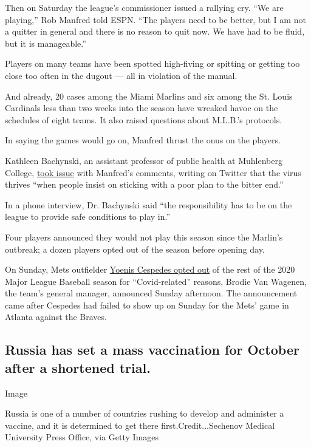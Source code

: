 Then on Saturday the league's commissioner issued a rallying cry. ``We
are playing,'' Rob Manfred told ESPN. ``The players need to be better,
but I am not a quitter in general and there is no reason to quit now. We
have had to be fluid, but it is manageable.''

Players on many teams have been spotted high-fiving or spitting or
getting too close too often in the dugout --- all in violation of the
manual.

And already, 20 cases among the Miami Marlins and six among the St.
Louis Cardinals less than two weeks into the season have wreaked havoc
on the schedules of eight teams. It also raised questions about M.L.B.'s
protocols.

In saying the games would go on, Manfred thrust the onus on the players.

Kathleen Bachynski, an assistant professor of public health at
Muhlenberg College,
\href{https://twitter.com/bachyns/status/1289665507117772800}{took
issue} with Manfred's comments, writing on Twitter that the virus
thrives ``when people insist on sticking with a poor plan to the bitter
end.''

In a phone interview, Dr. Bachynski said ``the responsibility has to be
on the league to provide safe conditions to play in.''

Four players announced they would not play this season since the
Marlin's outbreak; a dozen players opted out of the season before
opening day.

On Sunday, Mets outfielder
\href{https://www.nytimes3xbfgragh.onion/2020/08/02/sports/baseball/Yoenis-cespedes-opt-out-rule.html}{Yoenis
Cespedes opted out} of the rest of the 2020 Major League Baseball season
for ``Covid-related'' reasons, Brodie Van Wagenen, the team's general
manager, announced Sunday afternoon. The announcement came after
Cespedes had failed to show up on Sunday for the Mets' game in Atlanta
against the Braves.

\hypertarget{russia-has-set-a-mass-vaccination-for-october-after-a-shortened-trial}{%
\subsection{Russia has set a mass vaccination for October after a
shortened
trial.}\label{russia-has-set-a-mass-vaccination-for-october-after-a-shortened-trial}}

Image

Russia is one of a number of countries rushing to develop and administer
a vaccine, and it is determined to get there first.Credit...Sechenov
Medical University Press Office, via Getty Images

